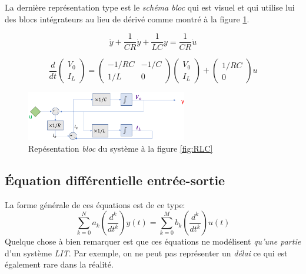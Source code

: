 \documentclass{report}
\begin{document}
La dernière représentation type est le \textit{schéma bloc} qui est visuel et qui utilise lui des blocs intégrateurs au lieu de dérivé comme montré à la figure \ref{fig:bloc}.

\begin{equation} \label{eqn:es}
\ddot{y} + \frac{1}{CR}\dot{y} + \frac{1}{LC}y = \frac{1}{CR}\dot{u}
\end{equation}

\begin{equation} \label{eqn:mat}
\frac{d}{dt}\begin{pmatrix}
V_0\\
I_L
\end{pmatrix} = \begin{pmatrix}
-1/RC & -1/C\\
1/L & 0
\end{pmatrix} \begin{pmatrix}
V_0\\
I_L
\end{pmatrix} + \begin{pmatrix}
1/RC\\
0
\end{pmatrix} u
\end{equation}

\begin{figure}[H] 
\centering
\includegraphics[width=7cm]{img/bloc.png}
\caption{Repésentation \textit{bloc} du système à la figure \ref{fig:RLC}}
\label{fig:bloc}
\end{figure}

\subsection{Équation différentielle entrée-sortie}
La forme générale de ces équations est de ce type:
\begin{equation}\label{eqn:difes}
\sum_{k = 0}^{N} a_k (\frac{d^k}{dt^k}) y(t) = \sum_{k = 0}^M b_k (\frac{d^k}{dt^k}) u(t)
\end{equation}
Quelque chose à bien remarquer est que ces équations ne modélisent \textit{qu'une partie} d'un système \textit{LIT}. Par exemple, on ne peut pas représenter un \textit{délai} ce qui est également rare dans la réalité.\\
\end{document}
